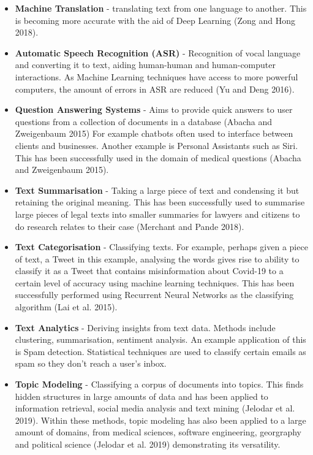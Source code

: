 \documentclass[
]{article}
\begin{document}
\begin{itemize}
\item
  \textbf{Machine Translation} - translating text from one language to
  another. This is becoming more accurate with the aid of Deep Learning
  (Zong and Hong 2018).
\item
  \textbf{Automatic Speech Recognition (ASR)} - Recognition of vocal
  language and converting it to text, aiding human-human and
  human-computer interactions. As Machine Learning techniques have
  access to more powerful computers, the amount of errors in ASR are
  reduced (Yu and Deng 2016).
\item
  \textbf{Question Answering Systems} - Aims to provide quick answers to
  user questions from a collection of documents in a database (Abacha
  and Zweigenbaum 2015) For example chatbots often used to interface
  between clients and businesses. Another example is Personal Assistants
  such as Siri. This has been successfully used in the domain of medical
  questions (Abacha and Zweigenbaum 2015).
\item
  \textbf{Text Summarisation} - Taking a large piece of text and
  condensing it but retaining the original meaning. This has been
  successfully used to summarise large pieces of legal texts into
  smaller summaries for lawyers and citizens to do research relates to
  their case (Merchant and Pande 2018).
\item
  \textbf{Text Categorisation} - Classifying texts. For example, perhaps
  given a piece of text, a Tweet in this example, analysing the words
  gives rise to ability to classify it as a Tweet that contains
  misinformation about Covid-19 to a certain level of accuracy using
  machine learning techniques. This has been successfully performed
  using Recurrent Neural Networks as the classifying algorithm (Lai et
  al. 2015).
\item
  \textbf{Text Analytics} - Deriving insights from text data. Methods
  include clustering, summarisation, sentiment analysis. An example
  application of this is Spam detection. Statistical techniques are used
  to classify certain emails as spam so they don't reach a user's inbox.
\item
  \textbf{Topic Modeling} - Classifying a corpus of documents into
  topics. This finds hidden structures in large amounts of data and has
  been applied to information retrieval, social media analysis and text
  mining (Jelodar et al. 2019). Within these methods, topic modeling has
  also been applied to a large amount of domains, from medical sciences,
  software engineering, georgraphy and political science (Jelodar et al.
  2019) demonstrating its versatility.
\end{itemize}
\end{document}
